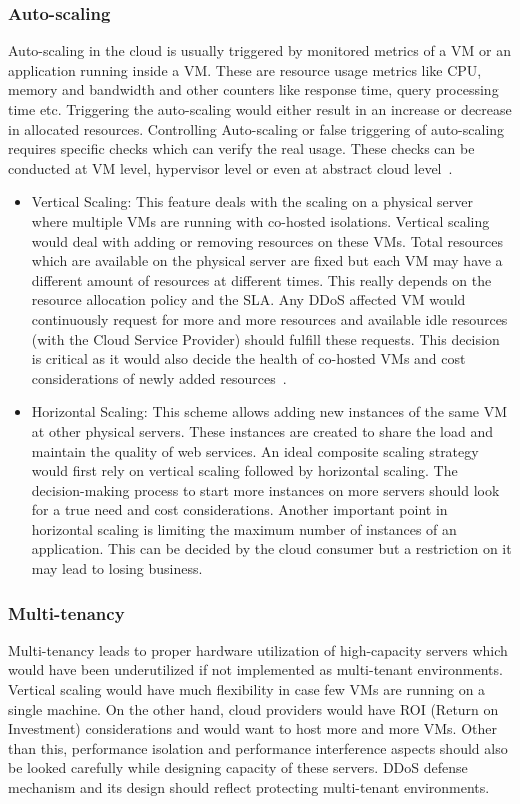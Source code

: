 \documentclass[final,5p,times,twocolumn]{elsarticle}
\begin{document}
\subsubsection{Auto-scaling}
Auto-scaling in the cloud is usually triggered by monitored metrics of a VM or an application running inside a VM. These are resource usage metrics like CPU, memory and bandwidth and other counters like response time, query processing time etc. Triggering the auto-scaling would either result in an increase or decrease in allocated resources. Controlling Auto-scaling or false triggering of auto-scaling requires specific checks which can verify the real usage. These checks can be conducted at VM level, hypervisor level or even at abstract cloud level~\cite{DARAC}. 
\begin{itemize}
\item Vertical Scaling: This feature deals with the scaling on a physical server where multiple VMs are running with co-hosted isolations. Vertical scaling would deal with adding or removing resources on these VMs. Total resources which are available on the physical server are fixed but each VM may have a different amount of resources at different times. This really depends on the resource allocation policy and the SLA. Any DDoS affected VM would continuously request for more and more resources and available idle resources (with the Cloud Service Provider) should fulfill these requests. This decision is critical as it would also decide the health of co-hosted VMs and cost considerations of newly added resources~\cite{somani2016ddos}.
\item Horizontal Scaling: This scheme allows adding new instances of the same VM at other physical servers. These instances are created to share the load and maintain the quality of web services. An ideal composite scaling strategy would first rely on vertical scaling followed by horizontal scaling. The decision-making process to start more instances on more servers should look for a true need and cost considerations. Another important point in horizontal scaling is limiting the maximum number of instances of an application. This can be decided by the cloud consumer but a restriction on it may lead to losing business.
\end{itemize}
\subsubsection{Multi-tenancy}
Multi-tenancy leads to proper hardware utilization of high-capacity servers which would have been underutilized if not implemented as multi-tenant environments. Vertical scaling would have much flexibility in case few VMs are running on a single machine. On the other hand, cloud providers would have ROI (Return on Investment) considerations and would want to host more and more VMs. Other than this, performance isolation and performance interference aspects should also be looked carefully while designing capacity of these servers. DDoS defense mechanism and its design should reflect protecting multi-tenant environments. 
\end{document}
